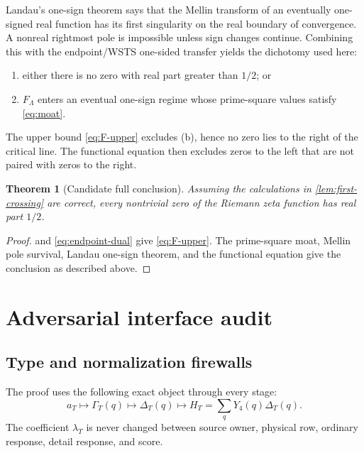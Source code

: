 \documentclass[11pt]{article}
\newtheorem{theorem}{Theorem}[section]
\newcommand{\Yfour}{Y_4}
\begin{document}
Landau's one-sign theorem says that the Mellin transform of an eventually one-signed real function has its first singularity on the real boundary of convergence. A nonreal rightmost pole is impossible unless sign changes continue. Combining this with the endpoint/WSTS one-sided transfer yields the dichotomy used here:
\begin{enumerate}[label=(\alph*)]
\item either there is no zero with real part greater than $1/2$; or
\item $F_\Lambda$ enters an eventual one-sign regime whose prime-square values satisfy \eqref{eq:moat}.
\end{enumerate}
The upper bound \eqref{eq:F-upper} excludes (b), hence no zero lies to the right of the critical line. The functional equation then excludes zeros to the left that are not paired with zeros to the right.

\begin{theorem}[Candidate full conclusion]\label{thm:RH}
Assuming the calculations in \cref{lem:first-crossing} are correct, every nontrivial zero of the Riemann zeta function has real part $1/2$.
\end{theorem}

\begin{proof}
 and \eqref{eq:endpoint-dual} give \eqref{eq:F-upper}. The prime-square moat, Mellin pole survival, Landau one-sign theorem, and the functional equation give the conclusion as described above.
\end{proof}

\section{Adversarial interface audit}

\subsection{Type and normalization firewalls}

The proof uses the following exact object through every stage:
\[
 a_T\longmapsto \Gamma_T(q)\longmapsto\Delta_T(q)
 \longmapsto H_T=\sum_q\Yfour(q)\Delta_T(q).
\]
The coefficient $\lambda_T$ is never changed between source owner, physical row, ordinary response, detail response, and score.
\end{document}
